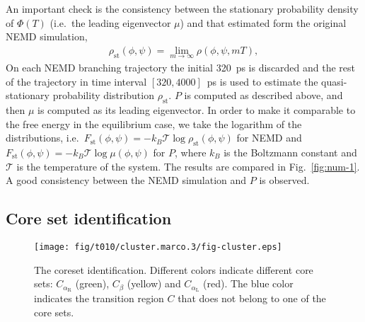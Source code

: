\documentclass[aps, pre, preprint,unsortedaddress,a4paper,onecolumn]{revtex4}
\newcommand{\mymu}{\mu}
\newcommand{\dih}{\textrm{dih}}
\newcommand{\confaa}[0]{{\alpha_{\textrm{R}}}}
\newcommand{\confc}[0]{{\alpha_{\textrm{L}}}}
\begin{document}
An important check is the consistency between the
stationary probability density of $\Phi(T)$ (i.e.~the leading eigenvector $\mymu$) and that 
estimated form the original NEMD simulation,
\begin{align}
  \label{eq:num-tmp1}
  \rho_{\textrm{st}}(\phi,\psi) = \lim_{m\rightarrow\infty} \rho (\phi,\psi,mT),
\end{align}
On each NEMD branching trajectory the initial 320~ps is discarded and
the rest of the trajectory in time interval $[320,4000]$~ps is used to estimate
the quasi-stationary probability distribution $\rho_{\textrm{st}}$. 
$P$ is computed as described above, and then $\mymu$ is computed as its leading eigenvector. In order to make it comparable to the free energy in the equilibrium case, we take
the logarithm of the distributions, i.e.~$F_{\textrm{st}}(\phi,\psi)=
-k_B\mathcal T\log \rho_{\textrm{st}}(\phi,\psi)$
for NEMD and $F_{\textrm{st}}(\phi,\psi)=
-k_B\mathcal T\log \mu(\phi,\psi)$ for $P$, where $k_B$ is the
Boltzmann constant and $\mathcal T$ is the temperature of the system.
The
results are  compared in Fig.~\ref{fig:num-1}. A good consistency between
the  NEMD simulation and 
$P$ is observed.  


\subsection{Core set identification}

\begin{figure}
  \centering
  \texttt{[image: fig/t010/cluster.marco.3/fig-cluster.eps]}
  \caption{The coreset identification. Different colors indicate different core sets: $C_{\confaa}$ (green), $C_\beta$ (yellow) and $C_{\confc}$ (red).
    The blue color indicates the transition region $C$ that does not belong to one of the core sets.}
  \label{fig:cluster}
\end{figure}
\end{document}
